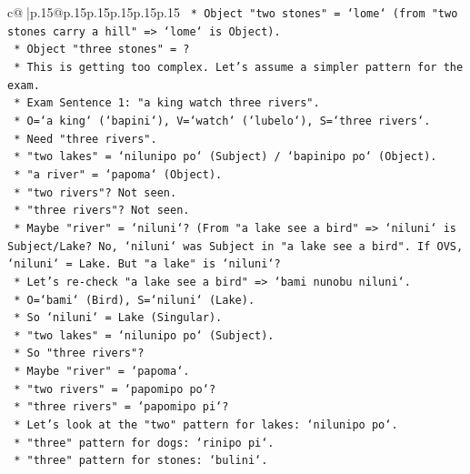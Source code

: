 \documentclass{article}
\begin{document}
{\begin{supertabular}{c@{$\;$}|p{.15\linewidth}@{}p{.15\linewidth}p{.15\linewidth}p{.15\linewidth}p{.15\linewidth}p{.15\linewidth}}
{{{\texttt{            *   Object "two stones" = `lome` (from "two stones carry a hill" => `lome` is Object).} \\
\texttt{            *   Object "three stones" = ?} \\
\texttt{            *   This is getting too complex. Let's assume a simpler pattern for the exam.} \\
\texttt{            *   Exam Sentence 1: "a king watch three rivers".} \\
\texttt{                *   O=`a king` (`bapini`), V=`watch` (`lubelo`), S=`three rivers`.} \\
\texttt{                *   Need "three rivers".} \\
\texttt{                *   "two lakes" = `nilunipo po` (Subject) / `bapinipo po` (Object).} \\
\texttt{                *   "a river" = `papoma` (Object).} \\
\texttt{                *   "two rivers"? Not seen.} \\
\texttt{                *   "three rivers"? Not seen.} \\
\texttt{                *   Maybe "river" = `niluni`? (From "a lake see a bird" => `niluni` is Subject/Lake? No, `niluni` was Subject in "a lake see a bird". If OVS, `niluni` = Lake. But "a lake" is `niluni`?} \\
\texttt{                *   Let's re{-}check "a lake see a bird" => `bami nunobu niluni`.} \\
\texttt{                    *   O=`bami` (Bird), S=`niluni` (Lake).} \\
\texttt{                    *   So `niluni` = Lake (Singular).} \\
\texttt{                *   "two lakes" = `nilunipo po` (Subject).} \\
\texttt{                *   So "three rivers"?} \\
\texttt{                *   Maybe "river" = `papoma`.} \\
\texttt{                *   "two rivers" = `papomipo po`?} \\
\texttt{                *   "three rivers" = `papomipo pi`?} \\
\texttt{                *   Let's look at the "two" pattern for lakes: `nilunipo po`.} \\
\texttt{                *   "three" pattern for dogs: `rinipo pi`.} \\
\texttt{                *   "three" pattern for stones: `bulini`.} \\
}}}
\end{supertabular}}
\end{document}
